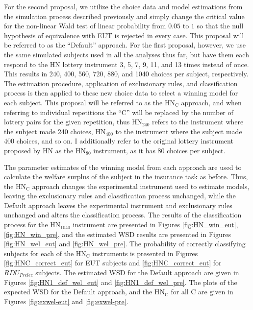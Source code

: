 \documentclass[../main.tex]{subfiles}
\begin{document}
For the second proposal, we utilize the choice data and model estimations from the simulation process described previously and simply change the critical value for the non-linear Wald test of linear probability from $0.05$ to $1$ so that the null hypothesis of equivalence with EUT is rejected in every case.
This proposal will be referred to as the \enquote{Default} approach.
For the first proposal, however, we use the same simulated subjects used in all the analyses thus far, but have them each respond to the HN lottery instrument 3, 5, 7, 9, 11, and 13 times instead of once.
This results in 240, 400, 560, 720, 880, and 1040 choices per subject, respectively.
The estimation procedure, application of exclusionary rules, and classification process is then applied to these new choice data to select a winning model for each subject.
This proposal will be referred to as the $\text{HN}_\text{C}$ approach, and when referring to individual repetitions the \enquote{C} will be replaced by the number of lottery pairs for the given repetition, thus $\text{HN}_{240}$ refers to the instrument where the subject made 240 choices, $\text{HN}_{400}$ to the instrument where the subject made 400 choices, and so on.
I additionally refer to the original lottery instrument proposed by HN as the $\text{HN}_{80}$ instrument, as it has 80 choices per subject.

The parameter estimates of the winning model from each approach are used to calculate the welfare surplus of the subject in the insurance task as before.
Thus, the $\text{HN}_\text{C}$ approach changes the experimental instrument used to estimate models, leaving the exclusionary rules and classification process unchanged, while the Default approach leaves the experimental instrument and exclusionary rules unchanged and alters the classification process.
The results of the classification process for the $\text{HN}_{1040}$ instrument are presented in Figures \ref{fig:HN_win_eut}, \ref{fig:HN_win_pre}, and the estimated WSD results are presented in Figures \ref{fig:HN_wel_eut} and \ref{fig:HN_wel_pre}.
The probability of correctly classifying subjects for each of the $\text{HN}_\text{C}$ instruments is presented in Figures \ref{fig:HNC_correct_eut} for EUT subjects and \ref{fig:HNC_correct_eut} for $\mathit{RDU_{Prelec}}$ subjects.
The estimated WSD for the Default approach are given in Figures \ref{fig:HN1_def_wel_eut} and \ref{fig:HN1_def_wel_pre}.
The plots of the expected WSD for the Default approach, and the $\text{HN}_\text{C}$ for all C are given in Figures \ref{fig:exwel-eut} and \ref{fig:exwel-pre}.
\end{document}
